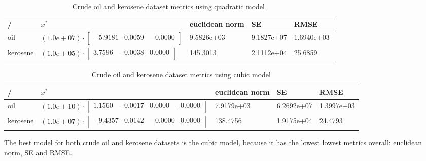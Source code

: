 \documentclass[unicode,11pt,a4paper,oneside,numbers=endperiod,openany]{scrartcl}
\begin{document}
\begin{table}[H]
    \centering
    \caption{Crude oil and kerosene dataset metrics using quadratic model}
    \label{table:ex2c}
    \begin{tabular}{||l l l l l||}
        \hline
        \slash   & $x^*$                                                                         & euclidean norm & SE         & RMSE       \\
        \hline\hline
        oil      & $(1.0e+07) \cdot \begin{bmatrix} -5.9181 & 0.0059 & -0.0000 \\ \end{bmatrix}$ & 9.5826e+03     & 9.1827e+07 & 1.6940e+03 \\
        kerosene & $(1.0e+05) \cdot \begin{bmatrix} 3.7596 & -0.0038 & 0.0000 \\ \end{bmatrix}$  & 145.3013       & 2.1112e+04 & 25.6859    \\
        \hline
    \end{tabular}
\end{table}

\begin{table}[H]
    \centering
    \caption{Crude oil and kerosene dataset metrics using cubic model}
    \label{table:ex2d}
    \begin{tabular}{||l l l l l||}
        \hline
        \slash   & $x^*$                                                                                  & euclidean norm & SE         & RMSE       \\
        \hline\hline
        oil      & $(1.0e+10) \cdot \begin{bmatrix} 1.1560 & -0.0017 & 0.0000 & -0.0000 \\ \end{bmatrix}$ & 7.9179e+03     & 6.2692e+07 & 1.3997e+03 \\
        kerosene & $(1.0e+07) \cdot \begin{bmatrix} -9.4357 & 0.0142 & -0.0000 & 0.0000 \\ \end{bmatrix}$ & 138.4756       & 1.9175e+04 & 24.4793    \\
        \hline
    \end{tabular}
\end{table}

The best model for both crude oil and kerosene datasets is the cubic model,
because it has the lowest lowest metrics overall: euclidean norm, SE and RMSE. \\
\end{document}
